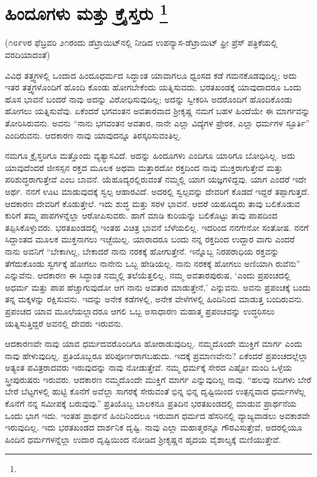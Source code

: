 
\chapter[ಹಿಂದೂಗಳು ಮತ್ತು ಕ್ರೈಸ್ತರು ]{ಹಿಂದೂಗಳು ಮತ್ತು ಕ್ರೈಸ್ತರು \protect\footnote{}}

\centerline{(೧೮೯೪ರ ಫೆಬ್ರವರಿ ೨೧ರಂದು ಡೆಟ್ರಾಯಿಟ್​ನಲ್ಲಿ ನೀಡಿದ ಉಪನ್ಯಾಸ-ಡೆಟ್ರಾಯಿಟ್​ ಫ್ರೀ ಪ್ರೆಸ್​ ಪತ್ರಿಕೆಯಲ್ಲಿ ವರದಿಯಾದಂತೆ)}

ವಿವಿಧ ತತ್ತ್ವಗಳಲ್ಲಿ ಒಂದಾದ ಹಿಂದೂಧರ್ಮದ ಸಿದ್ಧಾಂತ ಯಾವಾಗಲೂ ಧ್ವಂಸದ ಕಡೆ ಗಮನಕೊಡವುದಿಲ್ಲ; ಅದು ಇತರ ತತ್ತ್ವಗಳೊಂದಿಗೆ ಹೊಂದಿ ಕೊಂಡು ಹೋಗಬೇಕೆಂದು ಯತ್ನಿಸುವದು. ಭರತಖಂಡಕ್ಕೆ ಯಾವುದಾದರೂ ಒಂದು ಹೊಸ ಭಾವನೆ ಬಂದರೆ ನಾವು ಅದನ್ನು ವಿರೋಧಿಸುವುದಿಲ್ಲ; ಅದನ್ನು ಸ್ವೀಕರಿಸಿ ಅದರೊಂದಿಗೆ ಹೊಂದಿಕೊಂಡು ಹೋಗಲು ಯತ್ನಿಸುವೆವು. ಏಕೆಂದರೆ ಭಗವಂತನ ಅವತಾರವಾದ ಶ‍್ರೀಕೃಷ್ಣ ನಮಗೆ ಬಹಳ ಹಿಂದೆಯೇ ಈ ಮಾರ್ಗವನ್ನು ತೋರಿಸಿರುವನು. ಅವನು “ನಾನು ಭಗವಂತನ ಅವತಾರ, ನಾನೇ ಎಲ್ಲಾ ವಿದ್ಯೆಗಳ ಪ್ರೇರಕ, ಎಲ್ಲಾ ಧರ್ಮಗಳ ಸ್ಫೂರ್ತಿ” ಎಂದಿರುವನು. ಆದಕಾರಣ ನಾವು ಯಾವುದನ್ನೂ ತಿರಸ್ಕರಿಸುವಂತಿಲ್ಲ.

ನಮಗೂ ಕ್ರೈಸ್ತರಿಗೂ ಮತ್ತೊಂದು ವ್ಯತ್ಯಾಸವಿದೆ. ಅದನ್ನು ಹಿಂದೂಗಳು ಎಂದಿಗೂ ಯಾರಿಗೂ ಬೋಧಿಸಿಲ್ಲ. ಅದು ಯಾವುದೆಂದರೆ ಜೀಸಸ್ಸನ ರಕ್ತದ ಮೂಲಕ ಅಥವಾ ಮತ್ತಾರದೋ ರಕ್ತದಿಂದ ನಾವು ಮುಕ್ತರಾಗುತ್ತೇವೆ ಮತ್ತು ಪರಿಶುದ್ಧರಾಗುತ್ತೇವೆ ಎಂಬ ಬಾವನೆ. ಯೆಹೂದ್ಯರಲ್ಲಿರುವಂತೆ ನಮ್ಮಲ್ಲಿ ಯಾಗ ಯಜ್ಞಗಳಿದ್ದವು. ಯಾಗ ಎಂದರೆ ಇದೇ ಅರ್ಥ. ನನಗೆ ಊಟ ಮಾಡುವುದಕ್ಕೆ ಸ್ವಲ್ಪ ಆಹಾರವಿದೆ. ಅದರಲ್ಲಿ ಸ್ವಲ್ಪವನ್ನು ದೇವರಿಗೆ ಕೊಡದೆ ಇದ್ದರೆ ತಪ್ಪಾಗುತ್ತದೆ. ಆದಕಾರಣ ದೇವರಿಗೆ ಕೊಡುತ್ತೇಲೆ. ಇದು ಶುದ್ಧ ಮತ್ತು ಸರಳ ಭಾವನೆ. ಆದರೆ ಯಹೂದ್ಯರು ತಾವು ಬಲಿಕೊಡುವ ಕುರಿಗೆ ತಮ್ಮ ಪಾಪಗಳನ್ನೆಲ್ಲಾ ಆರೋಪಿಸುವರು. ಹಾಗೆ ಮಾಡಿ ಕುರಿಯನ್ನು ಬಲಿಕೊಟ್ಟು ತಾವು ಪಾಪದಿಂದ ತಪ್ಪಿಸಿಕೊಳ್ಳುವರು. ಭರತಖಂಡದಲ್ಲಿ ಇಂತಹ ವಿಚಿತ್ರ ಭಾವನೆ ಬೆಳೆಯಲಿಲ್ಲ. ಇದರಿಂದ ನನಗೇನೋ ಸಂತೋಷ. ನನಗೆ ಸಿದ್ದಾಂತದ ಮೂಲಕ ಮುಕ್ತನಾಗಲು ಇಚ್ಛೆಯಿಲ್ಲ. ಯಾರಾದರೂ ಬಂದು ನನ್ನ ರಕ್ತದಿಂದ ಉದ್ದಾರ ವಾಗು ಎಂದರೆ ನಾನು ಅವನಿಗೆ “ಬೇಕಾಗಿಲ್ಲ, ಬೇಕಾದರೆ ನಾನು ನರಕಕ್ಕೆ ಹೋಗುತ್ತೇನೆ. ಇನ್ನೊಬ್ಬ ನಿರಪರಾಧಿಯ ರಕ್ತವನ್ನು ತೆಗೆದುಕೊಂಡು ಸ್ವರ್ಗಕ್ಕೆ ಹೋಗಲು ನಾನೇನು ಒಬ್ಬ ಹೇಡಿಯಲ್ಲ. ನಾನು ನರಕಕ್ಕೆ ಹೋಗಲು ಅಣಿಯಾಗಿ ರುವೆನು” ಎನ್ನುವೆನು. ಆದಕಾರಣ ಈ ಸಿದ್ಧಾಂತ ನಮ್ಮಲ್ಲಿ ತಲೆಯೆತ್ತಲಿಲ್ಲ. ನಮ್ಮ ಅವತಾರಪುರುಷ, ‘ಎಂದು ಪ್ರಪಂಚದಲ್ಲಿ ಅಧರ್ಮ ಮತ್ತು ಪಾಪ ಹೆಚ್ಚಾಗುವುದೋ ಆಗ ನಾನು ಅವತಾರ ಮಾಡುತ್ತೇನೆ,’ ಎನ್ನುವನು. ಅವನು ಪ್ರಪಂಚಕ್ಕೆ ಬಂದು ತನ್ನ ಮಕ್ಕಳನ್ನು ರಕ್ಷಿಸುವನು. ಇದನ್ನು ಅನೇಕ ಕಡೆಗಳಲ್ಲಿ, ಅನೇಕ ವೇಳೆಗಳಲ್ಲಿ ಹಿಂದಿನಿಂದ ಮಾಡುತ್ತ ಬಂದಿರುವನು. ಪ್ರಪಂಚದ ಯಾವ ಮೂಲೆಯಲ್ಲಾದರೂ ಆಗಲಿ ಒಬ್ಬ ಅಸಾಧಾರಣ ಮಹಾತ್ಮ ಪ್ರಪಂಚವನ್ನು ಉದ್ಧರಿಸಲು ಯತ್ನಿಸುತ್ತಿದ್ದರೆ ಅವನಲ್ಲಿ ದೇವರು ಇರುವನು.

ಆದಕಾರಣವೇ ನಾವು ಯಾವ ಧರ್ಮದವರೊಂದಿಗೂ ಹೋರಾಡುವುದಿಲ್ಲ. ನಮ್ಮದೊಂದೇ ಮುಕ್ತಿಗೆ ಮಾರ್ಗ ಎಂದು ನಾವು ಹೇಳುವುದಿಲ್ಲ. ಪ್ರತಿಯೊಬ್ಬರೂ ಪರಿಪೂರ್ಣರಾಗಬಹುದು. ಇದಕ್ಕೆ ಪ್ರಮಾಣವೇನು? ಏಕೆಂದರೆ ಪ್ರಪಂಚದಲ್ಲೆಲ್ಲಾ ಅತ್ಯಂತ ಪವಿತ್ರರಾದವರು ಇರುವುದನ್ನು ನಾವು ನೋಡುತ್ತೇವೆ. ನಮ್ಮ ಧರ್ಮಕ್ಕೆ ಸೇರದ ಎಷ್ಟೋ ಮಂದಿ ಒಳ್ಳೆಯ ಸ್ತ್ರೀಪುರುಷರು ಇರುವರು. ಆದಕಾರಣ ನಮ್ಮದೊಂದೇ ಮುಕ್ತಿಗೆ ಮಾರ್ಗ ಎನ್ನುವುದಿಲ್ಲ ನಾವು. “ಹಲವು ನದಿಗಳು ಬೇರೆ ಬೇರೆ ಬೆಟ್ಟಗಳಲ್ಲಿ ಹುಟ್ಟಿ ಕೊನೆಗೆ ಅವೆಲ್ಲಾ ಸಾಗರಕ್ಕೆ ಸೇರುವಂತೆ ಭಿನ್ನ ಭಿನ್ನ ದೃಷ್ಟಿಯಿಂದ ಉತ್ಪನ್ನವಾದ ಧರ್ಮಗಳೆಲ್ಲ ಕೊನೆಗೆ ನನ್ನ ಸಮೀಪಕ್ಕೆ ಬರುವುವು.” ಪ್ರತಿಯೊಬ್ಬ ಬಾಲಕನೂ ಪ್ರತಿದಿನ ಭರತಖಂಡದಲ್ಲಿ ಮಾಡುವ ಪ್ರಾರ್ಥನೆಯ ಒಂದು ಭಾಗ ಇದು. ಇಂತಹ ಪ್ರಾರ್ಥನೆ ಹಿಂದಿನಿಂದಲೂ ಇರುವಾಗ ಧರ್ಮದ ಹೆಸರಿನಲ್ಲಿ ವ್ಯಾಜ್ಯವಾಡಲು ಅವಕಾಶವೇ ಇರುವುದಿಲ್ಲ. ಇದು ಭರತಖಂಡದ ದಾರ್ಶನಿಕ ದೃಷ್ಟಿ. ನಾವು ಎಲ್ಲಾ ಮಹಾತ್ಮರನ್ನೂ ಗೌರವಿಸುತ್ತೇವೆ, ಅದರಲ್ಲಿಯೂ ಹಿಂದಿನ ಧರ್ಮಗಳನ್ನೆಲ್ಲಾ ಉದಾರ ದೃಷ್ಟಿಯಿಂದ ನೋಡಿದ ಶ‍್ರೀಕೃಷ್ಣನ ಹೃದಯ ವೈಶಾಲ್ಯಕ್ಕೆ ಮಣಿಯುತ್ತೇವೆ.

